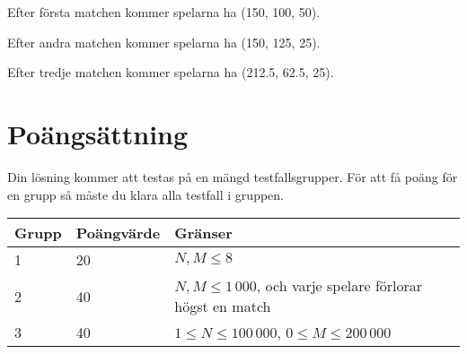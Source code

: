 Efter första matchen kommer spelarna ha (150, 100, 50).

Efter andra matchen kommer spelarna ha (150, 125, 25).

Efter tredje matchen kommer spelarna ha (212.5, 62.5, 25).

\section*{Poängsättning}
Din lösning kommer att testas på en mängd testfallsgrupper. För att få poäng
för en grupp så måste du klara alla testfall i gruppen.

\begin{tabular}{| l | l | l | l |}
\hline
Grupp & Poängvärde & Gränser    \\ \hline
1     & 20         & $N, M \le 8$ \\ \hline
2     & 40         & $N, M \le 1\,000$, och varje spelare förlorar högst en match \\ \hline
3     & 40         & $1 \le N \le 100\,000$, $0 \le M \le 200\,000$  \\ \hline
\end{tabular}
